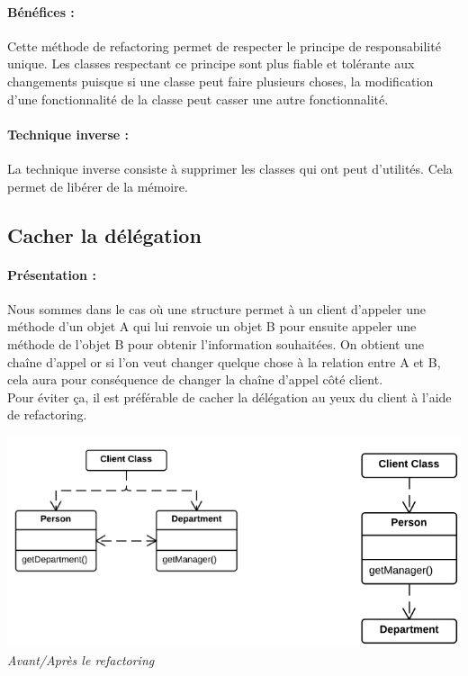 \documentclass[a4paper,twoside,12pt,openright]{report}
\begin{document}
\paragraph{Bénéfices :}
Cette méthode de refactoring permet de respecter le principe de responsabilité unique.
Les classes respectant ce principe sont plus fiable et tolérante aux changements puisque si une classe peut faire plusieurs choses, la modification d'une fonctionnalité de la classe peut casser une autre fonctionnalité.

\paragraph{Technique inverse :}
La technique inverse consiste à supprimer les classes qui ont peut d'utilités. Cela permet de libérer de la mémoire.

\subsection{Cacher la délégation}
\paragraph{Présentation :}
Nous sommes dans le cas où une structure permet à un client d'appeler une méthode d'un objet A qui lui renvoie un objet B pour ensuite appeler une méthode de l'objet B pour obtenir l'information souhaitées. On obtient une chaîne d'appel or si l'on veut changer quelque chose à la relation entre A et B, cela aura pour conséquence de changer la chaîne d'appel côté client.\\
Pour éviter ça, il est préférable de cacher la délégation au yeux du client à l'aide de refactoring.

\begin{center}
\includegraphics[scale=0.7]{Image/Cacher_Delegation.png}\\
\itshape{Avant/Après le refactoring \cite{ref5}}
\end{center}
\end{document}
